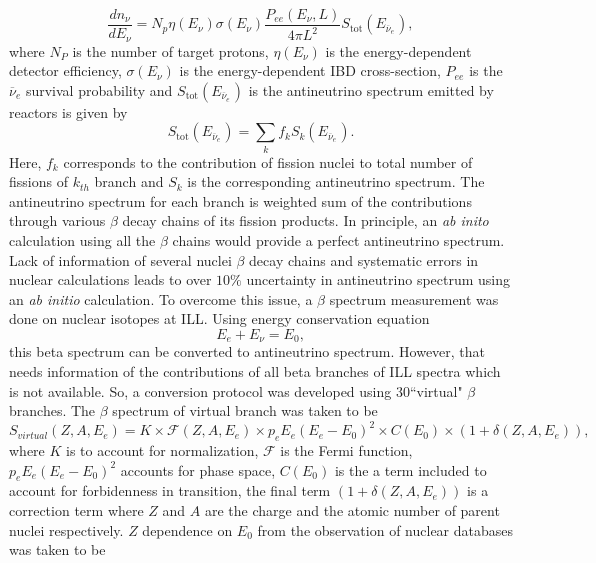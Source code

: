 \documentclass[11pt]{article}
\newcommand{\nuebar}{\ensuremath{\overline{\nu }_{e}} \hspace{1pt}}
\numberwithin{equation}{section}
\begin{document}
\begin{equation}
\label{eq:obsspectrum}
\frac{dn_{\nu}}{d E_{\nu}}= N_{p} \eta(E_{\nu}) \sigma(E_{\nu}) \frac{P_{ee}(E_{\nu},L)}{4 \pi L^{2}}S_{\text{tot}}(E_{\nuebar}),
\end{equation}
where $N_{P} $ is the number of target protons, $ \eta(E_{\nu}) $ is the energy-dependent detector efficiency, $\sigma (E_{\nu})$ is the energy-dependent IBD cross-section, $ P_{ee}$ is the \nuebar survival probability and $ S_{\text{tot}}(E_{\nuebar})$ is the antineutrino spectrum emitted by reactors is given by 
\begin{equation}
S_{\text{tot}}(E_{\nuebar}) = \sum_{k} f_{k} S_{k}(E_{\nuebar}).
\end{equation}
Here, $f_{k}$ corresponds to the contribution of fission nuclei to total number of fissions of $k_{th}$ branch and $S_k$ is the corresponding antineutrino spectrum. The antineutrino spectrum for each branch is weighted sum of the contributions through various $\beta$ decay chains of its fission products. In principle, an \textit{ab inito} calculation using all the $\beta$ chains would provide a perfect antineutrino spectrum. Lack of information of several nuclei $\beta$ decay chains and systematic errors in nuclear calculations leads to over $10 \%$ uncertainty in antineutrino spectrum using an \textit{ab initio} calculation. 
To overcome this issue, a $\beta$ spectrum measurement was done on nuclear isotopes at ILL. Using energy conservation equation 
\begin{equation}
\label{eq:enuconversion}
E_{e} + E_{\nu}=E_{0},
\end{equation}
 this beta spectrum can be converted to antineutrino spectrum. However, that needs information of the contributions of all beta branches of ILL spectra which is not available. So, a conversion protocol was developed \cite{Schreckenbach1985325} using 30``virtual" $\beta$ branches. The $\beta$ spectrum of virtual branch was taken to be 
\begin{equation}
\label{eq:virtual}
S_{virtual}(Z, A, E_{e}) = K \times \mathscr{F}(Z, A, E_{e}) \times p_{e} E_{e} (E_{e}-E_{0})^{2}\times C(E_{0}) \times (1+ \delta (Z, A, E_{e})),
\end{equation}
where $K$ is to account for normalization, $\mathscr{F}$ is the Fermi function, $p_{e} E_{e} (E_{e}-E_{0})^{2}$ accounts for phase space, $C(E_{0})$ is the a term included to account for forbidenness in transition, the final term $(1+ \delta (Z, A, E_{e}))$ is a correction term where $Z$ and $A$ are the charge and the atomic number of parent nuclei respectively. $Z$ dependence on $E_{0}$ from the observation of nuclear databases was taken to be 
\end{document}
